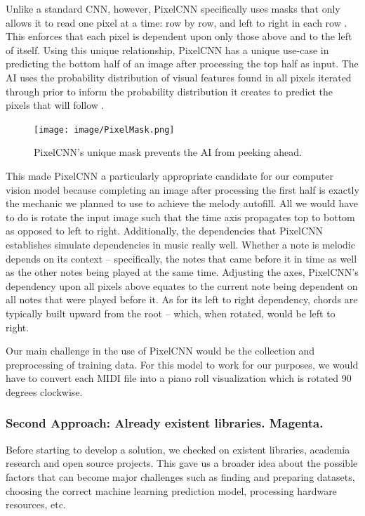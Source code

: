 Unlike a standard CNN, however, PixelCNN specifically uses masks that only allows it to read
one pixel at a time: row by row, and left to right in each row \autocite{pixelCNN}. This enforces that each pixel
is dependent upon only those above and to the left of itself. Using this unique relationship,
PixelCNN has a unique use-case in predicting the bottom half of an image after processing the
top half as input. The AI uses the probability distribution of visual features found in all pixels
iterated through prior to inform the probability distribution it creates to predict the pixels that
will follow \autocite{pixelRNN}.

\begin{figure}[h!]
  \centering
  \texttt{[image: image/PixelMask.png]}
  \caption{PixelCNN's unique mask prevents the AI from peeking ahead.}
  \label{fig:pixel_mask}
\end{figure}

This made PixelCNN a particularly appropriate candidate for our computer vision model
because completing an image after processing the first half is exactly the mechanic we
planned to use to achieve the melody autofill. All we would have to do is rotate the input
image such that the time axis propagates top to bottom as opposed to left to right.
Additionally, the dependencies that PixelCNN establishes simulate dependencies in music
really well. Whether a note is melodic depends on its context -- specifically, the
notes that came before it in time as well as the other notes being played at the same
time. Adjusting the axes, PixelCNN's dependency upon all pixels above equates to the
current note being dependent on all notes that were played before it. As for its left to
right dependency, chords are typically built upward from the root -- which, when rotated,
would be left to right.

Our main challenge in the use of PixelCNN would be the collection and preprocessing of
training data. For this model to work for our purposes, we would have to convert each MIDI
file into a piano roll visualization which is rotated 90 degrees clockwise.


\subsubsection{Second Approach: Already existent libraries. Magenta.}

Before starting to develop a solution, we checked on existent libraries, academia
research and open source projects. This gave us a broader idea about the possible
factors that can become major challenges such as finding and preparing datasets,
choosing the correct machine learning prediction model, processing hardware
resources, etc.

